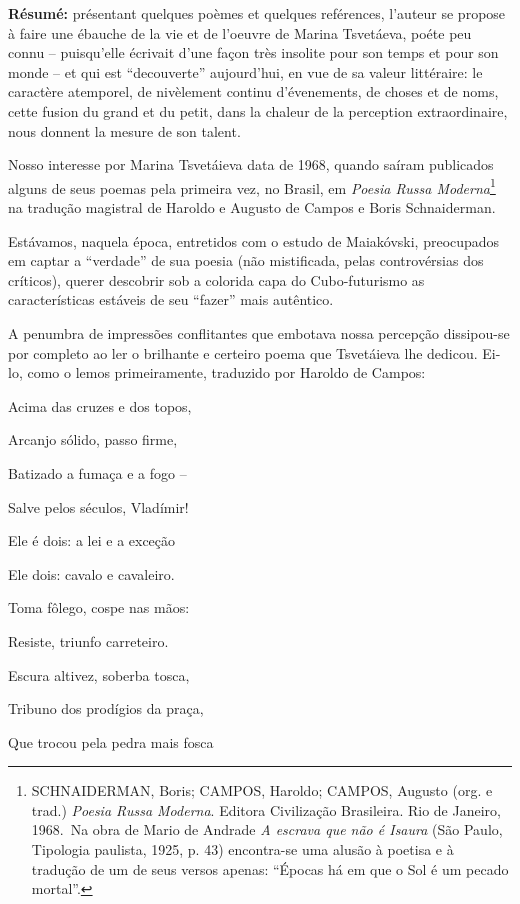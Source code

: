 \textbf{Résumé:} présentant quelques poèmes et quelques reférences,
l'auteur se propose à faire une ébauche de la vie et de l'oeuvre de
Marina Tsvetáeva, poéte peu connu -- puisqu'elle écrivait d'une façon
très insolite pour son temps et pour son monde -- et qui est
``decouverte'' aujourd'hui, en vue de sa valeur littéraire: le caractère
atemporel, de nivèlement continu d'évenements, de choses et de noms,
cette fusion du grand et du petit, dans la chaleur de la perception
extraordinaire, nous donnent la mesure de son talent.

Nosso interesse por Marina Tsvetáieva data de 1968, quando saíram
publicados alguns de seus poemas pela primeira vez, no Brasil, em
\emph{Poesia Russa Moderna}\footnote{SCHNAIDERMAN, Boris; CAMPOS,
  Haroldo; CAMPOS, Augusto (org. e trad.) \emph{Poesia Russa Moderna}.
  Editora Civilização Brasileira. Rio de Janeiro, 1968.~Na obra de Mario
  de Andrade \emph{A escrava que não é Isaura} (São Paulo, Tipologia
  paulista, 1925, p. 43) encontra-se uma alusão à poetisa e à tradução
  de um de seus versos apenas: ``Épocas há em que o Sol é um pecado
  mortal''.} na tradução magistral de Haroldo e Augusto de Campos e
Boris Schnaiderman.

Estávamos, naquela época, entretidos com o estudo de Maiakóvski,
preocupados em captar a ``verdade'' de sua poesia (não mistificada,
pelas controvérsias dos críticos), querer descobrir sob a colorida capa
do Cubo-futurismo as características estáveis de seu ``fazer'' mais
autêntico.

A penumbra de impressões conflitantes que embotava nossa percepção
dissipou-se por completo ao ler o brilhante e certeiro poema que
Tsvetáieva lhe dedicou. Ei-lo, como o lemos primeiramente, traduzido por
Haroldo de Campos:

Acima das cruzes e dos topos,

Arcanjo sólido, passo firme,

Batizado a fumaça e a fogo --

Salve pelos séculos, Vladímir!

Ele é dois: a lei e a exceção

Ele dois: cavalo e cavaleiro.

Toma fôlego, cospe nas mãos:

Resiste, triunfo carreteiro.

Escura altivez, soberba tosca,

Tribuno dos prodígios da praça,

Que trocou pela pedra mais fosca

